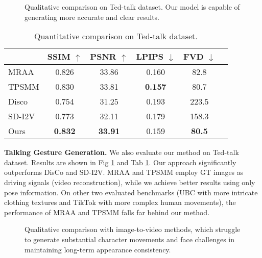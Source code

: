 \begin{figure}[!t]
\begin{center}
	\setlength{\fboxrule}{0pt}
\end{center}
\vspace{-0.6cm}
\caption{Qualitative comparison on Ted-talk dataset. Our model is capable of generating more accurate and clear results.}
\vspace{-0.2cm}
\label{fig:rebuttal_fig}
\end{figure}

\begin{table}
	\centering
\begin{center}
\begin{tabular}{lccccc} 

\hline
    & SSIM $\uparrow$ & PSNR $\uparrow$ & LPIPS $\downarrow$ & FVD $\downarrow$ \\
 \hline
MRAA\cite{mraa} & 0.826 & 33.86 & 0.160 & 82.8 \\
TPSMM\cite{tpsmm} & 0.830 & 33.81 & \textbf{0.157} & 80.7 \\
Disco\cite{disco} & 0.754 & 31.25 & 0.193 & 223.5 \\
SD-I2V  & 0.773 & 32.11 & 0.179 & 158.3 \\
Ours & \textbf{0.832} & \textbf{33.91} & 0.159 & \textbf{80.5} \\
 
\hline
\end{tabular}
\end{center}    \vspace{-0.5cm}
	\caption{Quantitative comparison on Ted-talk dataset.}
    \vspace{-0.3cm}
	\label{table:tedtalk}
\end{table}

\noindent
\textbf{Talking Gesture Generation. }
We also evaluate our method on Ted-talk dataset. 
Results are shown in Fig \ref{fig:rebuttal_fig} and Tab \ref{table:tedtalk}. Our approach significantly outperforms DisCo and SD-I2V. MRAA and TPSMM employ GT images as driving signals (video reconstruction), while we achieve better results using only pose information. On other two evaluated benchmarks (UBC with more intricate clothing textures and TikTok with more complex human movements), the performance of MRAA and TPSMM falls far behind our method.

\begin{figure}[!t]
\begin{center}
	\setlength{\fboxrule}{0pt}
\end{center}
\vspace{-0.6cm}
\caption{Qualitative comparison with image-to-video methods, which struggle to generate substantial character movements and face challenges in maintaining long-term appearance consistency.}
\vspace{-0.2cm}
\label{fig:i2v}
\end{figure}


